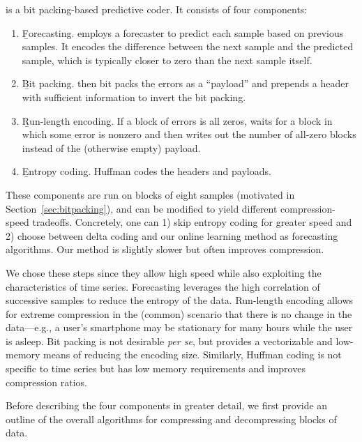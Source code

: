 \minesp is a bit packing-based predictive coder. It consists of four components:
\begin{enumerate}
\itemsep0em
\item \b{Forecasting.} \minesp employs a forecaster to predict each sample based on previous samples. It encodes the difference between the next sample and the predicted sample, which is typically closer to zero than the next sample itself.
\item \b{Bit packing.} \minesp then bit packs the errors as a ``payload'' and prepends a header with sufficient information to invert the bit packing.
\item \b{Run-length encoding.} If a block of errors is all zeros, \minesp waits for a block in which some error is nonzero and then writes out the number of all-zero blocks instead of the (otherwise empty) payload.
\item \b{Entropy coding.} \minesp Huffman codes the headers and payloads.
\end{enumerate}

These components are run on blocks of eight samples (motivated in Section~\ref{sec:bitpacking}), and can be modified to yield different compression-speed tradeoffs. Concretely, one can 1) skip entropy coding for greater speed and 2) choose between delta coding and our online learning method as forecasting algorithms. Our method is slightly slower but often improves compression.

We chose these steps since they allow high speed while also exploiting the characteristics of time series. Forecasting leverages the high correlation of successive samples to reduce the entropy of the data. Run-length encoding allows for extreme compression in the (common) scenario that there is no change in the data---e.g., a user's smartphone may be stationary for many hours while the user is asleep. Bit packing is not desirable \textit{per se}, but provides a vectorizable and low-memory means of reducing the encoding size. Similarly, Huffman coding is not specific to time series but has low memory requirements and improves compression ratios.

Before describing the four components in greater detail, we first provide an outline of the overall algorithms for compressing and decompressing blocks of data.


